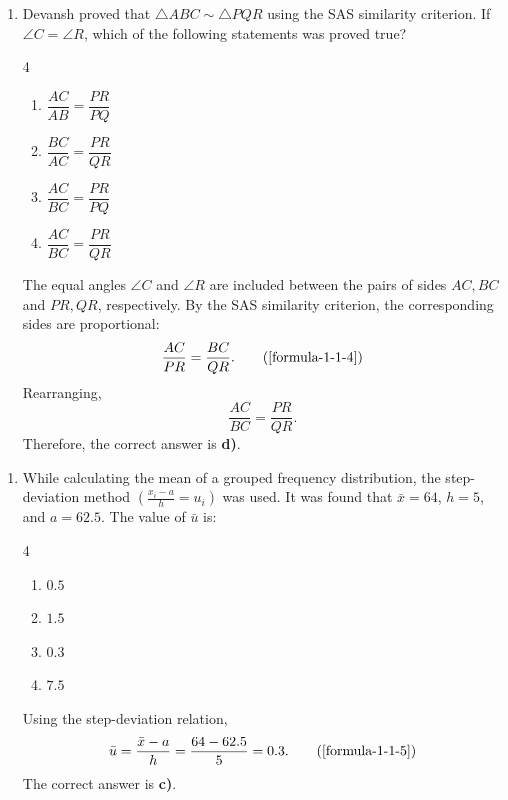 \begin{enumerate}[label={},leftmargin=1.15cm,labelwidth=1.0cm,labelsep=0.15cm,itemindent=0pt,listparindent=0pt,parsep=0pt,topsep=0pt]
\item[5.1.5] Devansh proved that $\triangle ABC \sim \triangle PQR$ using the SAS similarity criterion. If $\angle C = \angle R$, which of the following statements was proved true?

\begin{multicols}{4}
\begin{enumerate}
\setlength{\itemsep}{0pt}
    \item $\dfrac{AC}{AB} = \dfrac{PR}{PQ}$
    \item $\dfrac{BC}{AC} = \dfrac{PR}{QR}$
    \item $\dfrac{AC}{BC} = \dfrac{PR}{PQ}$
    \item $\dfrac{AC}{BC} = \dfrac{PR}{QR}$
\end{enumerate}
\end{multicols}

\vspace{0.7em}\par\solution


The equal angles $\angle C$ and $\angle R$ are included between the pairs of sides $AC, BC$ and $PR, QR$, respectively. By the SAS similarity criterion, the corresponding sides are proportional:
\begin{equation*}
\frac{AC}{PR} = \frac{BC}{QR}.
\tag*{(\ref{formula-1-1-4})}\end{equation*}
Rearranging,
\[
\frac{AC}{BC} = \frac{PR}{QR}.
\]
Therefore, the correct answer is \textbf{d)}.


\end{enumerate}
\vspace{1.2em}
\begin{enumerate}[label={},leftmargin=1.15cm,labelwidth=1.0cm,labelsep=0.15cm,itemindent=0pt,listparindent=0pt,parsep=0pt,topsep=0pt]
\item[5.1.6] While calculating the mean of a grouped frequency distribution, the step-deviation method $\left(\frac{x_i-a}{h}=u_i\right)$ was used. It was found that $\bar{x}=64$, $h=5$, and $a=62.5$. The value of $\bar{u}$ is:

\begin{multicols}{4}
\begin{enumerate}
\setlength{\itemsep}{0pt}
    \item $0.5$
    \item $1.5$
    \item $0.3$
    \item $7.5$
\end{enumerate}
\end{multicols}

\vspace{0.7em}\par\solution


Using the step-deviation relation,
\begin{equation*}
\bar{u}=\frac{\bar{x}-a}{h}=\frac{64-62.5}{5}=0.3.
\tag*{(\ref{formula-1-1-5})}\end{equation*}
The correct answer is \textbf{c)}.

\end{enumerate}
